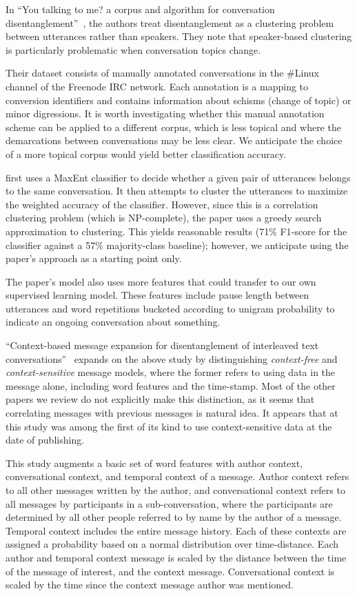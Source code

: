 \documentclass[10pt]{article}
\newcommand{\titlecite}[2]{``#1''~\cite{#2}}
\begin{document}
In \titlecite{You talking to me? a corpus and algorithm for conversation
disentanglement}{Elsner2008a}, the authors treat disentanglement as a clustering problem between 
utterances rather than speakers. They note that speaker-based clustering is
particularly problematic when conversation topics change.

Their dataset consists of manually annotated conversations in the \#Linux channel of 
the Freenode IRC network. Each annotation is a mapping to conversion identifiers
and contains information about schisms (change of 
topic) or minor digressions. It is worth investigating whether this 
manual annotation scheme can be applied to a different corpus, 
which is less topical and where the demarcations between conversations 
may be less clear. We anticipate the choice
of a more topical corpus would yield better classification accuracy.

\cite{Elsner2008a} first uses a MaxEnt classifier to decide whether a given pair of
utterances belongs to the same conversation. It then attempts to cluster the
utterances to maximize the weighted accuracy of the classifier. However, since
this is a correlation clustering problem (which is NP-complete), the paper uses
a greedy search approximation to clustering. This yields reasonable
results (71\% F1-score for the classifier against a 57\% majority-class baseline); 
however, we anticipate using the paper's approach as a starting point only.

The paper's model also uses more features that could transfer to
our own supervised learning model. These features include pause length
between utterances and word repetitions bucketed according to unigram
probability to indicate an ongoing conversation about something.

\titlecite{Context-based message expansion for disentanglement of interleaved 
text conversations}{Wang2009b} expands on the above study by distinguishing
\textit{context-free} and \textit{context-sensitive} message models, where the 
former refers to using data in the message alone, including word features and the
time-stamp. Most of the other papers we review do not explicitly make this 
distinction, as it seems that correlating messages with previous messages is 
natural idea. It appears that at this study was among the first of its 
kind to use context-sensitive data at the date of publishing.

This study augments a basic set of word features with author context, 
conversational context, and temporal context of a message. Author context 
refers to all other messages written by the author, and conversational context 
refers to all messages by participants in a sub-conversation, 
where the participants are determined by all other people referred to by name 
by the author of a message. Temporal context includes the entire message 
history. Each of these contexts are assigned a probability based on a normal 
distribution over time-distance. Each author and temporal context message is 
scaled by the distance between the time of the message of interest, and the 
context message. Conversational context is scaled by the time since the 
context message author was mentioned.
\end{document}
